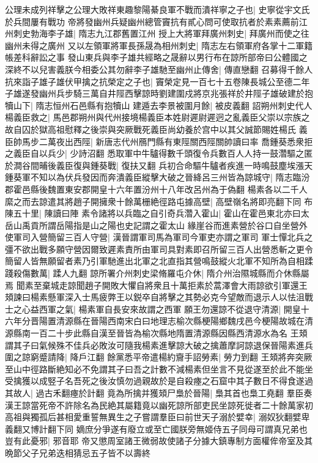 公理未成列祥擊之公理大敗祥東趣黎陽綦良軍不戰而潰祥寧之子也|{
	史寧從宇文氏於兵間屢有戰功}
帝將發幽州兵疑幽州總管竇抗有貳心問可使取抗者於素素薦前江州刺史勃海李子雄|{
	隋志九江郡舊置江州}
授上大將軍拜廣州刺史|{
	拜廣州而使之往幽州未得之廣州}
又以左領軍將軍長孫晟為相州刺史|{
	隋志左右領軍府各掌十二軍籍帳差科辭訟之事}
發山東兵與李子雄共經略之晟辭以男行布在諒所部帝曰公體國之深終不以兒害義朕今相委公其勿辭李子雄馳至幽州止傳舍|{
	傳直戀翻}
召募得千餘人抗來詣子雄子雄伏甲擒之抗榮定之子也|{
	竇榮定見一百七十五卷陳長城公至德二年}
子雄遂發幽州兵步騎三萬自井陘西擊諒時劉建圍戍將京兆張祥於井陘子雄破建於抱犢山下|{
	隋志恒州石邑縣有抱犢山}
建遁去李景被圍月餘|{
	被皮義翻}
詔朔州刺史代人楊義臣救之|{
	馬邑郡朔州與代州接境楊義臣本姓尉遲尉遲迥之亂義臣父崇以宗族之故自囚於獄高祖慰釋之後崇與突厥戰死義臣尚幼養於宫中以其父誠節賜姓楊氏}
義臣帥馬步二萬夜出西陘|{
	新唐志代州鴈門縣有東陘關西陘關帥讀曰率}
喬鍾葵悉衆拒之義臣自以兵少|{
	少詩沼翻}
悉取軍中牛驢得數千頭復令兵數百人人持一鼓濳驅之匿於澗谷間晡後義臣復與鍾葵戰|{
	復扶又翻}
兵初合命驅牛驢者疾進一時鳴鼓塵埃漲天鍾葵軍不知以為伏兵發因而奔潰義臣縱擊大破之晉絳呂三州皆為諒城守|{
	隋志臨汾郡霍邑縣後魏置東安郡開皇十六年置汾州十八年改呂州為于偽翻}
楊素各以二千人縻之而去諒遣其將趙子開擁衆十餘萬栅絶徑路屯據高壁|{
	高壁嶺名將即亮翻下同}
布陳五十里|{
	陳讀曰陣}
素令諸將以兵臨之自引奇兵濳入霍山|{
	霍山在霍邑東北亦曰太岳山禹貢所謂岳陽指是山之陽也史記謂之霍太山}
緣崖谷而進素營於谷口自坐營外使軍司入營簡留三百人守營|{
	漢晉謂軍司馬為軍司今軍吏亦謂之軍司}
軍士憚北兵之彊不欲出戰多願守營因爾致遲素責所由軍司具對素即召所留三百人出營悉斬之更令簡留人皆無願留者素乃引軍馳進出北軍之北直指其營鳴鼓縱火北軍不知所為自相蹂踐殺傷數萬|{
	蹂人九翻}
諒所署介州刺史梁脩羅屯介休|{
	隋介州治隰城縣而介休縣屬焉}
聞素至棄城走諒聞趙子開敗大懼自將衆且十萬拒素於蒿澤會大雨諒欲引軍還王頍諫曰楊素懸軍深入士馬疲弊王以鋭卒自將擊之其勢必克今望敵而退示人以怯沮戰士之心益西軍之氣|{
	楊素軍自長安來故謂之西軍}
願王勿還諒不從退守清源|{
	開皇十六年分晋陽置清源縣在晉陽西南宋白曰地理志榆次縣梗陽鄉魏戌邑今梗陽故城在清源縣南一百二十步此縣自漢至晉皆為榆次縣地隋置清源縣因縣西清源水為名}
王頍謂其子曰氣候殊不佳兵必敗汝可隨我楊素進擊諒大破之擒蕭摩訶諒退保晉陽素進兵圍之諒窮蹙請降|{
	降戶江翻}
餘黨悉平帝遣楊約齎手詔勞素|{
	勞力到翻}
王頍將奔突厥至山中徑路斷絶知必不免謂其子曰吾之計數不減楊素但坐言不見從遂至於此不能坐受擒獲以成竪子名吾死之後汝慎勿過親故於是自殺瘞之石窟中其子數日不得食遂過其故人|{
	過古禾翻瘞於計翻}
竟為所擒并獲頍尸梟於晉陽|{
	梟其首也梟工堯翻}
羣臣奏漢王諒當死帝不許除名為民絶其屬籍竟以幽死諒所部吏民坐諒死徙者二十餘萬家初高祖與獨孤后甚相愛重誓無異生之子嘗謂羣臣曰前世天子溺於嬖幸|{
	溺奴狄翻嬖卑義翻又博計翻下同}
嫡庶分爭遂有廢立或至亡國朕旁無姬侍五子同母可謂真兄弟也豈有此憂邪|{
	邪音耶}
帝又懲周室諸王微弱故使諸子分據大鎮專制方面權侔帝室及其晩節父子兄弟迭相猜忌五子皆不以壽終

